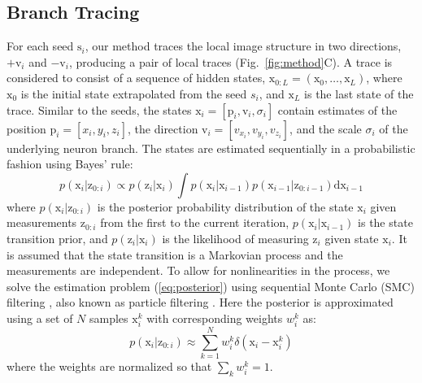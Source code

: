 \subsection{Branch Tracing}
\label{subsec:branch-tracing}
For each seed $\mathrm{s}_i$, our method traces the local image structure in two directions, $+\mathrm{v}_i$ and $-\mathrm{v}_i$, producing a pair of local traces (Fig.~\ref{fig:method}C). A trace is considered to consist of a sequence of hidden states, $\mathrm{x}_{0:L} = (\mathrm{x}_0,\dots,\mathrm{x}_L)$, where $\mathrm{x}_0$ is the initial state extrapolated from the seed $s_i$, and $\mathrm{x}_L$ is the last state of the trace. Similar to the seeds, the states $\mathrm{x}_i = \left[ \mathrm{p}_i, \mathrm{v}_i, \sigma_i \right]$ contain estimates of the position $\mathrm{p}_i = \left[ x_i, y_i, z_i  \right]$, the direction $\mathrm{v}_i = \left[ v_{x_i}, v_{y_i}, v_{z_i} \right]$, and the scale $\sigma_i$ of the underlying neuron branch. The states are estimated sequentially in a probabilistic fashion using Bayes' rule:
\begin{equation}
p(\mathrm{x}_i | \mathrm{z}_{0:i}) \propto  p(\mathrm{z}_i | \mathrm{x}_i) \!\!\int\!\! p(\mathrm{x}_i | \mathrm{x}_{i-1}) p(\mathrm{x}_{i-1} | \mathrm{z}_{0:i-1}) \mathrm{dx}_{i-1}
\label{eq:posterior}
\end{equation}
where $p(\mathrm{x}_i | \mathrm{z}_{0:i})$ is the posterior probability distribution of the state $\mathrm{x}_i$ given measurements $\mathrm{z}_{0:i}$ from the first to the current iteration, $p(\mathrm{x}_i | \mathrm{x}_{i-1})$ is the state transition prior, and $p(\mathrm{z}_i | \mathrm{x}_i)$ is the likelihood of measuring $\mathrm{z}_i$ given state $\mathrm{x}_i$. It is assumed that the state transition is a Markovian process and the measurements are independent. To allow for nonlinearities in the process, we solve the estimation problem (\ref{eq:posterior}) using sequential Monte Carlo (SMC) filtering \citep{doucet2001introduction}, also known as particle filtering \citep{arulampalam2002tutorial}. Here the posterior is approximated using a set of $N$ samples $\mathrm{x}_{i}^k$ with corresponding weights $w_i^k$ as:
\begin{equation}
p(\mathrm{x}_i | \mathrm{z}_{0:i}) \approx \sum_{k=1}^{N} w_i^k \delta(\mathrm{x}_i - \mathrm{x}_i^k)
\label{eq:approx}
\end{equation}
where the weights are normalized so that $\sum_k w_i^k = 1$.

